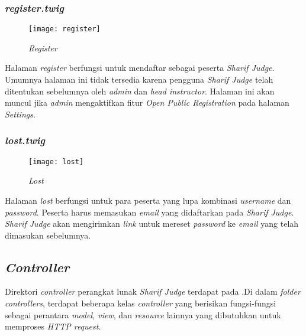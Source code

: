 \subsubsection{\textit{register.twig}}
\begin{figure}[H]
	\centering  
	\texttt{[image: register]}  
	\caption[\textit{Register}]{\textit{Register}} 
	\label{fig:register} 
\end{figure} 
Halaman \textit{register} berfungsi untuk mendaftar sebagai peserta \textit{Sharif Judge}. Umumnya halaman ini tidak tersedia karena pengguna \textit{Sharif Judge} telah ditentukan sebelumnya oleh \textit{admin} dan \textit{head instructor}. Halaman ini akan muncul jika \textit{admin} mengaktifkan fitur \textit{Open Public Registration} pada halaman \textit{Settings}.

\subsubsection{\textit{lost.twig}}
\begin{figure}[H]
	\centering  
	\texttt{[image: lost]}  
	\caption[\textit{Lost}]{\textit{Lost}} 
	\label{fig:lost} 
\end{figure} 
Halaman \textit{lost} berfungsi untuk para peserta yang lupa kombinasi \textit{username} dan \textit{password}. Peserta harus memasukan \textit{email} yang didaftarkan pada \textit{Sharif Judge}. \textit{Sharif Judge} akan mengirimkan \textit{link} untuk mereset \textit{password} ke \textit{email} yang telah dimasukan sebelumnya.

\subsection{\textit{Controller}}
Direktori \textit{controller} perangkat lunak \textit{Sharif Judge} terdapat pada .Di dalam \textit{folder controllers}, terdapat beberapa kelas \textit{controller} yang berisikan fungsi-fungsi sebagai perantara \textit{model, view}, dan \textit{resource} lainnya yang dibutuhkan untuk memproses \textit{HTTP request}.

